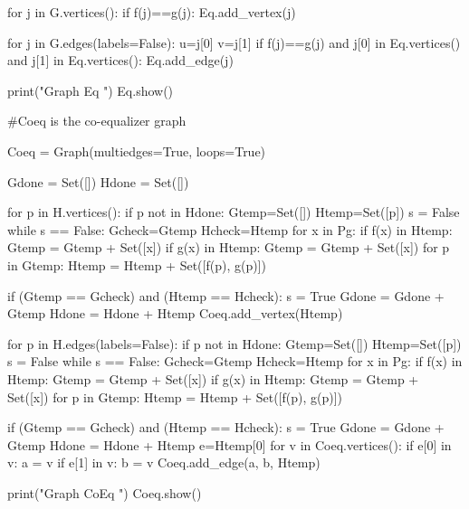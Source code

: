 \documentclass{ximera}
\begin{document}
\begin{sageCell}
for j in G.vertices():
    if f(j)==g(j):
        Eq.add_vertex(j)


for j in G.edges(labels=False):
    u=j[0]
    v=j[1]
    if f(j)==g(j) and j[0] in Eq.vertices() and j[1] in Eq.vertices():
        Eq.add_edge(j)


print("\n\n Graph Eq \n\n")
Eq.show()


#Coeq is the co-equalizer graph

Coeq = Graph(multiedges=True, loops=True)

Gdone = Set([])
Hdone = Set([])

for p in H.vertices():
    if p not in Hdone:
        Gtemp=Set([])
        Htemp=Set([p])
        s = False
        while s == False:
            Gcheck=Gtemp
            Hcheck=Htemp
            for x in Pg:
                if f(x) in Htemp:
                    Gtemp = Gtemp + Set([x])
                if g(x) in Htemp:
                    Gtemp = Gtemp + Set([x])
            for p in Gtemp:
                Htemp = Htemp + Set([f(p), g(p)])

            if (Gtemp == Gcheck) and (Htemp == Hcheck):
                s = True
                Gdone = Gdone + Gtemp
                Hdone = Hdone + Htemp
                Coeq.add_vertex(Htemp)


for p in H.edges(labels=False):
    if p not in Hdone:
        Gtemp=Set([])
        Htemp=Set([p])
        s = False
        while s == False:
            Gcheck=Gtemp
            Hcheck=Htemp
            for x in Pg:
                if f(x) in Htemp:
                    Gtemp = Gtemp + Set([x])
                if g(x) in Htemp:
                    Gtemp = Gtemp + Set([x])
            for p in Gtemp:
                Htemp = Htemp + Set([f(p), g(p)])

            if (Gtemp == Gcheck) and (Htemp == Hcheck):
                s = True
                Gdone = Gdone + Gtemp
                Hdone = Hdone + Htemp
                e=Htemp[0]
                for v in Coeq.vertices():
                    if e[0] in v:
                        a = v
                    if e[1] in v:
                        b = v
                Coeq.add_edge(a, b, Htemp)


print("\n\n Graph CoEq \n\n")
Coeq.show()
\end{sageCell}
\end{document}

